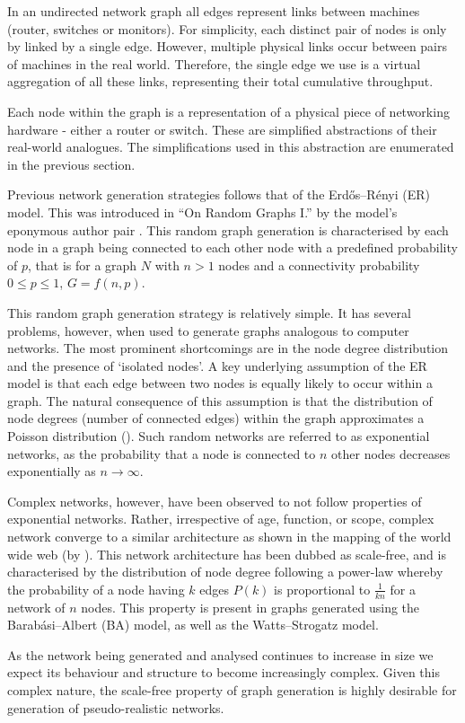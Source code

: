 In an undirected network graph all edges represent links between machines (router, switches or monitors). For simplicity, each distinct pair of nodes is only by linked by a single edge. However, multiple physical links occur between pairs of machines in the real world. Therefore, the single edge we use is a virtual aggregation of all these links, representing their total cumulative throughput. \par
Each node within the graph is a representation of a physical piece of networking hardware - either a router or switch. These are simplified abstractions of their real-world analogues. The simplifications used in this abstraction are enumerated in the previous section.\par
Previous network generation strategies follows that of the Erdős–Rényi (ER) model. This was introduced in “On Random Graphs I.” by the model’s eponymous author pair \cite{erdos_random_1959}. This random graph generation is characterised by each node in a graph being connected to each other node with a predefined probability of $p$, that is for a graph $N$ with $n>1$ nodes and a connectivity probability $0\leq p\leq 1$, $G=f(n,p)$.\par
This random graph generation strategy is relatively simple. It has several problems, however, when used to generate graphs analogous to computer networks. The most prominent shortcomings are in the node degree distribution and the presence of ‘isolated nodes’. A key underlying assumption of the ER model is that each edge between two nodes is equally likely to occur within a graph. The natural consequence of this assumption is that the distribution of node degrees (number of connected edges) within the graph approximates a Poisson distribution (\cite{albert-laszlo_scale-free_2003}). Such random networks are referred to as exponential networks, as the probability that a node is connected to $n$ other nodes decreases exponentially as $n\to\infty$.\par
Complex networks, however, have been observed to not follow properties of exponential networks. Rather, irrespective of age, function, or scope, complex network converge to a similar architecture as shown in the mapping of the world wide web (by \cite{albert_diameter_1999}). This network architecture has been dubbed as scale-free, and is characterised by the distribution of node degree following a power-law whereby the probability of a node having $k$ edges $P(k)$  is proportional to $\frac{1}{kn}$ for a network of $n$ nodes. This property is present in graphs generated using the Barabási–Albert (BA) model, as well as the Watts–Strogatz model.\par
As the network being generated and analysed continues to increase in size we expect its behaviour and structure to become increasingly complex. Given this complex nature, the scale-free property of graph generation is highly desirable for generation of pseudo-realistic networks.

